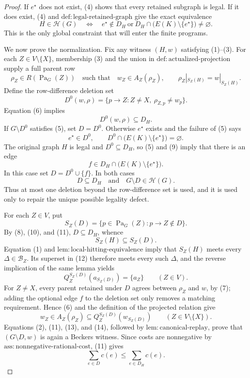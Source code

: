 \documentclass{article}
\begin{document}
\begin{proof}
If \(e^\star\) does not exist, (4) shows that every retained subgraph is legal.  If it does exist, (4) and \(\mathrm{def:legal\mbox{-}retained\mbox{-}graph}\) give the exact equivalence
\[
 H\in\mathcal H(G)
 \quad\Longleftrightarrow\quad
 e^\star\notin D_H
 \ \text{or}\ 
 D_H\cap\bigl(E(K)\setminus\{e^\star\}\bigr)\ne\varnothing.          \tag{5}
\]
This is the only global constraint that will enter the finite programs.

We now prove the normalization.  Fix any witness \((H,w)\) satisfying (1)--(3).  For each \(Z\in V\setminus\{X\}\), membership (3) and the union in \(\mathrm{def:actualized\mbox{-}projection}\) supply a full parent row
\[
 \rho_Z\in R(\operatorname{Pa}_G(Z))
 \quad\text{such that}\quad
 w_Z\in A_Z(\rho_Z),
 \qquad
 \rho_Z|_{S_Z(H)}=w|_{S_Z(H)}.                                        \tag{6}
\]
Define the row-difference deletion set
\[
 D^0(w,\rho)
 =\{p\to Z:Z\ne X,\ \rho_{Z,p}\ne w_p\}.                             \tag{7}
\]
Equation (6) implies
\[
 D^0(w,\rho)\subseteq D_H.                                            \tag{8}
\]
If \(G\setminus D^0\) satisfies (5), set \(D=D^0\).  Otherwise \(e^\star\) exists and the failure of (5) says
\[
 e^\star\in D^0,
 \qquad
 D^0\cap\bigl(E(K)\setminus\{e^\star\}\bigr)=\varnothing.           \tag{9}
\]
The original graph \(H\) is legal and \(D^0\subseteq D_H\), so (5) and (9) imply that there is an edge
\[
 f\in D_H\cap\bigl(E(K)\setminus\{e^\star\}\bigr).                  \tag{10}
\]
In this case set \(D=D^0\cup\{f\}\).  In both cases
\[
 D\subseteq D_H
 \quad\text{and}\quad
 G\setminus D\in\mathcal H(G).                                      \tag{11}
\]
Thus at most one deletion beyond the row-difference set is used, and it is used only to repair the unique possible legality defect.

For each \(Z\in V\), put
\[
 S_Z(D)=\{p\in\operatorname{Pa}_G(Z):p\to Z\notin D\}.
\]
By (8), (10), and (11), \(D\subseteq D_H\), whence
\[
 S_Z(H)\subseteq S_Z(D).                                               \tag{12}
\]
Equation (1) and \(\mathrm{lem:local\mbox{-}hitting\mbox{-}equivalence}\) imply that \(S_Z(H)\) meets every \(\Delta\in\mathcal B_Z\).  Its superset in (12) therefore meets every such \(\Delta\), and the reverse implication of the same lemma yields
\[
 Q_Z^{S_Z(D)}(a_{S_Z(D)})=\{a_Z\}
 \qquad (Z\in V).                                                     \tag{13}
\]
For \(Z\ne X\), every parent retained under \(D\) agrees between \(\rho_Z\) and \(w\), by (7); adding the optional edge \(f\) to the deletion set only removes a matching requirement.  Hence (6) and the definition of the projected relation give
\[
 w_Z\in A_Z(\rho_Z)
 \subseteq Q_Z^{S_Z(D)}(w_{S_Z(D)})
 \qquad (Z\in V\setminus\{X\}).                                    \tag{14}
\]
Equations (2), (11), (13), and (14), followed by \(\mathrm{lem:canonical\mbox{-}replay}\), prove that \((G\setminus D,w)\) is again a Beckers witness.  Since costs are nonnegative by \(\mathrm{ass:nonnegative\mbox{-}rational\mbox{-}cost}\), (11) gives
\[
 \sum_{e\in D}c(e)\le \sum_{e\in D_H}c(e).                          \tag{15}
\]


\end{proof}
\end{document}
